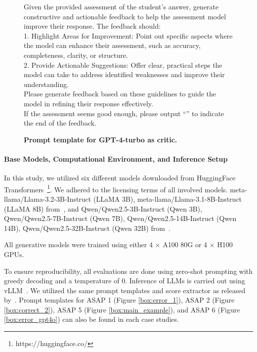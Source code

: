 \begin{figure}
\begin{tcolorbox}[
    colback=gray!10,      %
    colframe=gray!80,     %
    title=Prompt Template for GPT-4-turbo,
    fonttitle=\bfseries,  %
    rounded corners,
    boxrule=0.5mm,        %
    width=\linewidth,
    label={box:prompt}
]
\scriptsize
Given the provided assessment of the student's answer, generate constructive and actionable feedback to help the assessment model improve their response. The feedback should:\\
	1.	Highlight Areas for Improvement: Point out specific aspects where the model can enhance their assessment, such as accuracy, completeness, clarity, or structure.\\
	2.	Provide Actionable Suggestions: Offer clear, practical steps the model can take to address identified weaknesses and improve their understanding.\\
Please generate feedback based on these guidelines to guide the model in refining their response effectively.\\
If the assessment seems good enough, please output ``\text{[STOP]}'' to indicate the end of the feedback.
\end{tcolorbox}
\caption{\small\textbf{Prompt template for GPT-4-turbo as critic.}}
\label{box:critic_template}
\end{figure}

\paragraph{Base Models, Computational Environment, and Inference Setup} In this study, we utilized six different models downloaded from HuggingFace Transformers~\footnote{https://huggingface.co/}. We adhered to the licensing terms of all involved models. meta-llama/Llama-3.2-3B-Instruct (LLaMA 3B), meta-llama/Llama-3.1-8B-Instruct (LLaMA 8B) from~\cite{llama3}, and Qwen/Qwen2.5-3B-Instruct (Qwen 3B), Qwen/Qwen2.5-7B-Instruct (Qwen 7B), Qwen/Qwen2.5-14B-Instruct (Qwen 14B), Qwen/Qwen2.5-32B-Instruct (Qwen 32B) from~\cite{qwen2.5,qwen2_5_report}. 

All generative models were trained using either 4 $\times$ A100 80G or 4 $\times$ H100 GPUs. 

To ensure reproducibility, all evaluations are done using zero-shot prompting with greedy decoding and a temperature of 0. Inference of LLMs is carried out using vLLM~\cite{kwon2023efficient}. We utilized the same prompt templates and score extractor as released by~\cite{li_emnlp2024}. Prompt templates for ASAP 1 (Figure \ref{box:error_1}), ASAP 2 (Figure \ref{box:correct_2}), ASAP 5 (Figure \ref{box:main_example}), and ASAP 6 (Figure \ref{box:error_gpt4o}) can also be found in each case studies.

